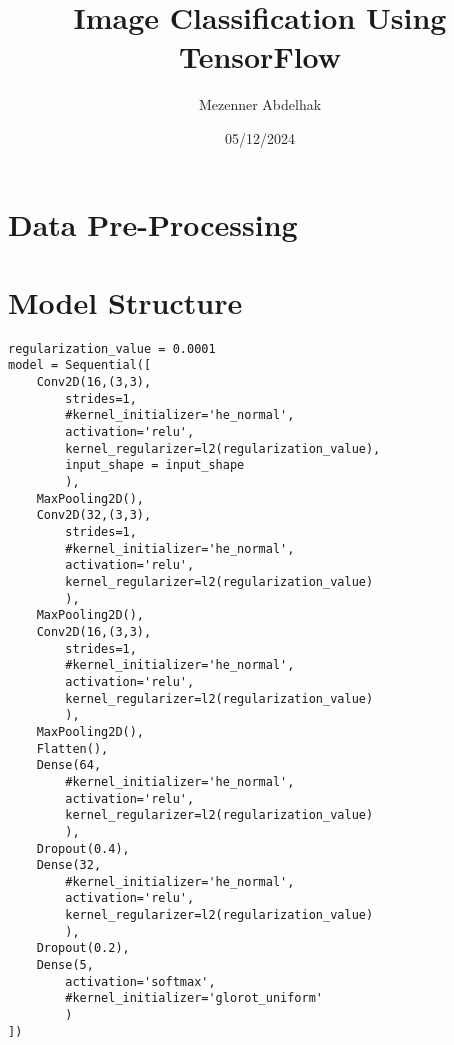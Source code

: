 \documentclass[12pt,a4paper]{article}
\begin{document}
\title{\Huge Image Classification Using TensorFlow}
\author{\LARGE Mezenner Abdelhak}
\date{\Large 05/12/2024}
\maketitle
\newpage
\section{Data Pre-Processing}
\section{Model Structure}
\begin{lstlisting}
regularization_value = 0.0001    
model = Sequential([
	Conv2D(16,(3,3),
		strides=1,
		#kernel_initializer='he_normal',
		activation='relu',
		kernel_regularizer=l2(regularization_value),
		input_shape = input_shape
		),
	MaxPooling2D(),
	Conv2D(32,(3,3),
		strides=1,
		#kernel_initializer='he_normal',
		activation='relu',
		kernel_regularizer=l2(regularization_value)
		),
	MaxPooling2D(),
	Conv2D(16,(3,3),
		strides=1,
		#kernel_initializer='he_normal',
		activation='relu',
		kernel_regularizer=l2(regularization_value)
		),
	MaxPooling2D(),
	Flatten(),			
	Dense(64,
		#kernel_initializer='he_normal',
		activation='relu',
		kernel_regularizer=l2(regularization_value)
		),
	Dropout(0.4),
	Dense(32,
		#kernel_initializer='he_normal',
		activation='relu',
		kernel_regularizer=l2(regularization_value)
		),	
	Dropout(0.2),
	Dense(5,
		activation='softmax',
		#kernel_initializer='glorot_uniform'
		)
])
\end{lstlisting}
\end{document}
